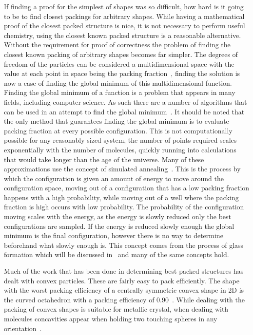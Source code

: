 If finding a proof for the simplest of shapes was so difficult, how hard is it going to be to find closest packings for arbitrary shapes. While having a mathematical proof of the closest packed structure is nice, it is not necessary to perform useful chemistry, using the closest known packed structure is a reasonable alternative. Without the requirement for proof of correctness the problem of finding the closest known packing of arbitrary shapes becomes far simpler. The degrees of freedom of the particles can be considered a multidimensional space with the value at each point in space being the packing fraction~, finding the solution is now a case of finding the global minimum of this multidimensional function. Finding the global minimum of a function is a problem that appears in many fields, including computer science. As such there are a number of algorithms that can be used in an attempt to find the global minimum~\tocite. It should be noted that the only method that guarantees finding the global minimum is to evaluate packing fraction at every possible configuration. This is not computationally possible for any reasonably sized system, the number of points required scales exponentially with the number of molecules, quickly running into calculations that would take longer than the age of the universe. Many of these approximations use the concept of simulated annealing~\tocite. This is the process by which the configuration is given an amount of energy to move around the configuration space, moving out of a configuration that has a low packing fraction happens with a high probability, while moving out of a well where the packing fraction is high occurs with low probability. The probability of the configuration moving scales with the energy, as the energy is slowly reduced only the best configurations are sampled. If the energy is reduced slowly enough the global minimum is the final configuration, however there is no way to determine beforehand what slowly enough is. This concept comes from the process of glass formation which will be discussed in~\secref{} and many of the same concepts hold.

\begin{figure}
    \caption{}
    \label{fig:packing space}
\end{figure}

Much of the work that has been done in determining best packed structures has dealt with convex particles. These are fairly easy to pack efficiently. The shape with the worst packing efficiency of a centrally symmetric convex shape in 2D is the curved octahedron with a packing efficiency of 0.90~\tocite. While dealing with the packing of convex shapes is suitable for metallic crystal, when dealing with molecules concavities appear when holding two touching spheres in any orientation~.

